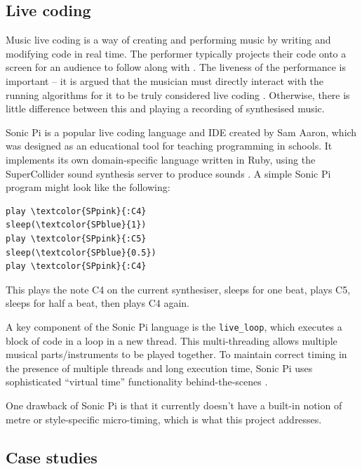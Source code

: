 \documentclass[12pt,twoside,openright]{report}
\begin{document}
\subsection{Live coding} \label{live_coding_background}

Music live coding is a way of creating and performing music by writing and
modifying code in real time. The performer typically projects their code onto a
screen for an audience to follow along with \cite{magnusson2011}. The liveness of the
performance is important -- it is argued that the musician must directly
interact with the running algorithms for it to be truly considered live coding
\cite{collins2011}. Otherwise, there is little difference between this and playing a
recording of synthesised music.

Sonic Pi is a popular live coding language and IDE created by Sam Aaron, which
was designed as an educational tool for teaching programming in schools. It
implements its own domain-specific language written in Ruby, using the
SuperCollider sound synthesis server to produce sounds \cite{aaron2013}. A simple
Sonic Pi program might look like the following:

\begin{BVerbatim}[commandchars=\\\{\}]
play \textcolor{SPpink}{:C4}
sleep(\textcolor{SPblue}{1})
play \textcolor{SPpink}{:C5}
sleep(\textcolor{SPblue}{0.5})
play \textcolor{SPpink}{:C4}
\end{BVerbatim}

This plays the note C4 on the current synthesiser, sleeps for one beat, plays C5,
sleeps for half a beat, then plays C4 again.

A key component of the Sonic Pi language is the \verb'live_loop', which executes a
block of code in a loop in a new thread. This multi-threading allows multiple
musical parts/instruments to be played together. To maintain correct timing in the presence
of multiple threads and long execution time, Sonic Pi uses sophisticated
``virtual time'' functionality behind-the-scenes \cite{aaron2014}.

One drawback of Sonic Pi is that it currently doesn't have a built-in notion of
metre or style-specific micro-timing, which is what this project addresses.


\subsection{Case studies} \label{case_studies}
\end{document}
